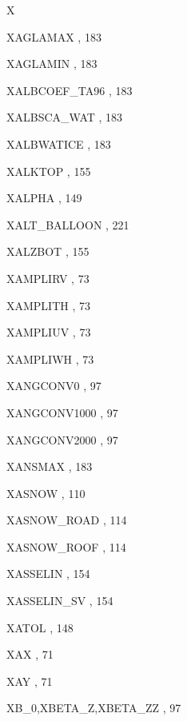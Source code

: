 \begin{theindex}
  \indexspace
X
  \item XAGLAMAX
    \subitem {},  183
  \item XAGLAMIN
    \subitem {},  183
  \item XALBCOEF\_TA96
    \subitem {},  183
  \item XALBSCA\_WAT
    \subitem {},  183
  \item XALBWATICE
    \subitem {},  183
  \item XALKTOP
    \subitem {},  155
  \item XALPHA
    \subitem {},  149
  \item XALT\_BALLOON
    \subitem {},  221
  \item XALZBOT
    \subitem {},  155
  \item XAMPLIRV
    \subitem {},  73
  \item XAMPLITH
    \subitem {},  73
  \item XAMPLIUV
    \subitem {},  73
  \item XAMPLIWH
    \subitem {},  73
  \item XANGCONV0
    \subitem {},  97
  \item XANGCONV1000
    \subitem {},  97
  \item XANGCONV2000
    \subitem {},  97
  \item XANSMAX
    \subitem {},  183
  \item XASNOW
    \subitem {},  110
  \item XASNOW\_ROAD
    \subitem {},  114
  \item XASNOW\_ROOF
    \subitem {},  114
  \item XASSELIN
    \subitem {},  154
  \item XASSELIN\_SV
    \subitem {},  154
  \item XATOL
    \subitem {},  148
  \item XAX
    \subitem {},  71
  \item XAY
    \subitem {},  71
  \item XB\_0,XBETA\_Z,XBETA\_ZZ
    \subitem {},  97

\end{theindex}
